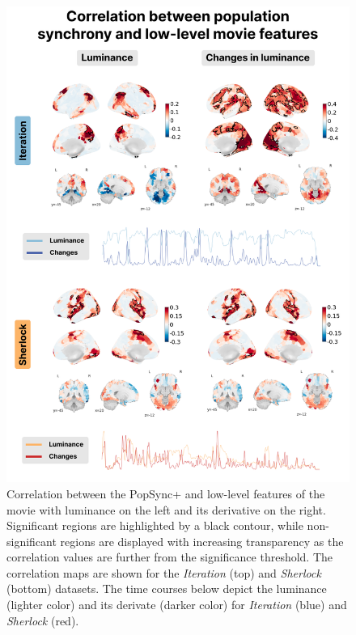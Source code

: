 \begin{figure}[!ht]
    \centering
    \includegraphics[width=0.7\linewidth]{figures/multi_subject/low_order_luminance.png}
    \caption[]{Correlation between the PopSync+ and low-level features of the
    movie with luminance on the left and its derivative on the right.
    Significant regions are highlighted by a black contour, while
    non-significant regions are displayed with increasing transparency as the
    correlation values are further from the significance threshold. The
    correlation maps are shown for the \textit{Iteration} (top) and
    \textit{Sherlock} (bottom) datasets. The time courses below depict the
    luminance (lighter color) and its derivate (darker color) for
    \textit{Iteration} (blue) and \textit{Sherlock} (red).}
    \label{fig:low_order_luminance}
\end{figure}

